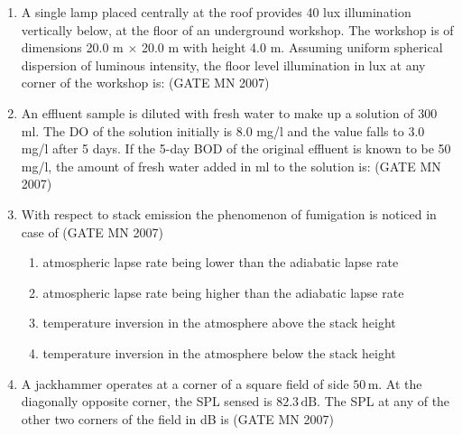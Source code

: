 \documentclass[journal]{IEEEtran}
\begin{document}
\begin{enumerate}
\item A single lamp placed centrally at the roof provides 40 lux illumination vertically below, at the floor of an underground workshop. The workshop is of dimensions 20.0 m $\times$ 20.0 m with height 4.0 m. Assuming uniform spherical dispersion of luminous intensity, the floor level illumination in lux at any corner of the workshop is:
\hfill (GATE MN 2007)
\begin{enumerate}
\end{enumerate}


\item An effluent sample is diluted with fresh water to make up a solution of 300 ml. The DO of the solution initially is 8.0 mg/l and the value falls to 3.0 mg/l after 5 days. If the 5-day BOD of the original effluent is known to be 50 mg/l, the amount of fresh water added in ml to the solution is:
\hfill (GATE MN 2007)
\begin{enumerate}
\end{enumerate}



\item With respect to stack emission the phenomenon of fumigation is noticed in case of 
	\hfill (GATE MN 2007)
\begin{enumerate}
    \item atmospheric lapse rate being lower than the adiabatic lapse rate
    \item atmospheric lapse rate being higher than the adiabatic lapse rate
    \item temperature inversion in the atmosphere above the stack height
    \item temperature inversion in the atmosphere below the stack height
\end{enumerate}


\item A jackhammer operates at a corner of a square field of side $50\,\text{m}$.  
At the diagonally opposite corner, the SPL sensed is $82.3\,\text{dB}$.  
The SPL at any of the other two corners of the field in dB is  
\hfill (GATE MN 2007)
\begin{enumerate}
\end{enumerate}




\end{enumerate}
\end{document}
